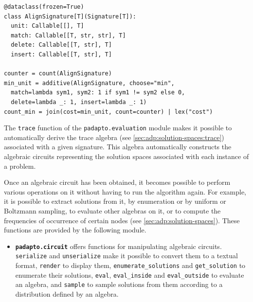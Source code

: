 \begin{listing}[htb]
\small
\begin{verbatim}
@dataclass(frozen=True)
class AlignSignature[T](Signature[T]):
  unit: Callable[[], T]
  match: Callable[[T, str, str], T]
  delete: Callable[[T, str], T]
  insert: Callable[[T, str], T]

counter = count(AlignSignature)
min_unit = additive(AlignSignature, choose="min",
  match=lambda sym1, sym2: 1 if sym1 != sym2 else 0,
  delete=lambda _: 1, insert=lambda _: 1)
count_min = join(cost=min_unit, count=counter) | lex("cost")
\end{verbatim}
    \caption[Definitions of a signature and of algebras with the \emph{padapto} library]{
        Definitions of a signature and of algebras for the sequence alignment problem introduced in \cref{ex:seq-align}.
        The signature adds to the predefined operators \texttt{null} and \texttt{choose} the nullary operator \texttt{unit}, representing an empty alignment, and the unary operators \texttt{match}, \texttt{delete} and \texttt{insert}, representing the three possible operations in an alignment.
        The \texttt{counter} algebra counts the solutions of the solution space,
        the \texttt{min\_unit} algebra computes the best cost of an alignment by assigning a unit cost to each operation,
        while \texttt{count\_min} combines the two algebras by counting the solutions that achieve the minimum cost.
        \label{lst:logiciel:padapto-sig-alg}
    }
\end{listing}

The \texttt{trace} function of the \texttt{padapto.evaluation} module makes it possible to automatically derive the trace algebra (see \cref{sec:adp:solution-spaces:trace}) associated with a given signature.
This algebra automatically constructs the algebraic circuits representing the solution spaces associated with each instance of a problem.

Once an algebraic circuit has been obtained, it becomes possible to perform various operations on it without having to run the algorithm again.
For example, it is possible to extract solutions from it, by enumeration or by uniform or Boltzmann sampling, to evaluate other algebras on it, or to compute the frequencies of occurrence of certain nodes (see \cref{sec:adp:solution-spaces}).
These functions are provided by the following module.

\begin{itemize}
    \item \textbf{\texttt{padapto.circuit}} offers functions for manipulating algebraic circuits. \texttt{serialize} and \texttt{unserialize} make it possible to convert them to a textual format, \texttt{render} to display them, \texttt{enumerate\_solutions} and \texttt{get\_solution} to enumerate their solutions, \texttt{eval}, \texttt{eval\_inside} and \texttt{eval\_outside} to evaluate an algebra, and \texttt{sample} to sample solutions from them according to a distribution defined by an algebra.
\end{itemize}

